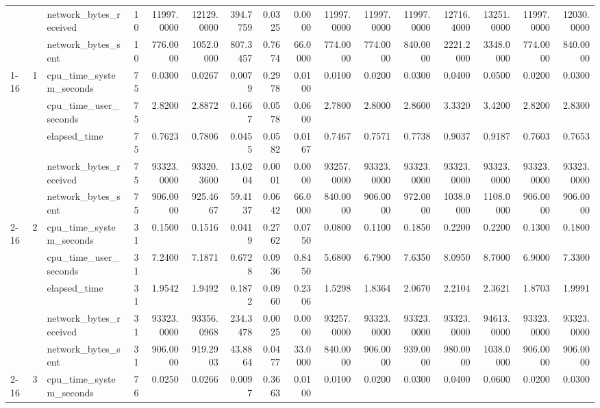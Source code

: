 \begin{tabular}{lllrrrrrrrrrrrrr}
 &  & network\_bytes\_received & 10 & 11997.0000 & 12129.0000 & 394.7759 & 0.0325 & 0.0000 & 11997.0000 & 11997.0000 & 11997.0000 & 12716.4000 & 13251.0000 & 11997.0000 & 12030.0000 \\
 &  & network\_bytes\_sent & 10 & 776.0000 & 1052.0000 & 807.3457 & 0.7674 & 66.0000 & 774.0000 & 774.0000 & 840.0000 & 2221.2000 & 3348.0000 & 774.0000 & 840.0000 \\
\cline{1-16} \cline{2-16}
\multirow[t]{15}{*}{knn-search-duckdb-small} & \multirow[t]{5}{*}{1} & cpu\_time\_system\_seconds & 75 & 0.0300 & 0.0267 & 0.0079 & 0.2978 & 0.0100 & 0.0100 & 0.0200 & 0.0300 & 0.0400 & 0.0500 & 0.0200 & 0.0300 \\
 &  & cpu\_time\_user\_seconds & 75 & 2.8200 & 2.8872 & 0.1667 & 0.0578 & 0.0600 & 2.7800 & 2.8000 & 2.8600 & 3.3320 & 3.4200 & 2.8200 & 2.8300 \\
 &  & elapsed\_time & 75 & 0.7623 & 0.7806 & 0.0455 & 0.0582 & 0.0167 & 0.7467 & 0.7571 & 0.7738 & 0.9037 & 0.9187 & 0.7603 & 0.7653 \\
 &  & network\_bytes\_received & 75 & 93323.0000 & 93320.3600 & 13.0204 & 0.0001 & 0.0000 & 93257.0000 & 93323.0000 & 93323.0000 & 93323.0000 & 93323.0000 & 93323.0000 & 93323.0000 \\
 &  & network\_bytes\_sent & 75 & 906.0000 & 925.4667 & 59.4137 & 0.0642 & 66.0000 & 840.0000 & 906.0000 & 972.0000 & 1038.0000 & 1108.0000 & 906.0000 & 906.0000 \\
\cline{2-16}
 & \multirow[t]{5}{*}{2} & cpu\_time\_system\_seconds & 31 & 0.1500 & 0.1516 & 0.0419 & 0.2762 & 0.0750 & 0.0800 & 0.1100 & 0.1850 & 0.2200 & 0.2200 & 0.1300 & 0.1800 \\
 &  & cpu\_time\_user\_seconds & 31 & 7.2400 & 7.1871 & 0.6728 & 0.0936 & 0.8450 & 5.6800 & 6.7900 & 7.6350 & 8.0950 & 8.7000 & 6.9000 & 7.3300 \\
 &  & elapsed\_time & 31 & 1.9542 & 1.9492 & 0.1872 & 0.0960 & 0.2306 & 1.5298 & 1.8364 & 2.0670 & 2.2104 & 2.3621 & 1.8703 & 1.9991 \\
 &  & network\_bytes\_received & 31 & 93323.0000 & 93356.0968 & 234.3478 & 0.0025 & 0.0000 & 93257.0000 & 93323.0000 & 93323.0000 & 93323.0000 & 94613.0000 & 93323.0000 & 93323.0000 \\
 &  & network\_bytes\_sent & 31 & 906.0000 & 919.2903 & 43.8864 & 0.0477 & 33.0000 & 840.0000 & 906.0000 & 939.0000 & 980.0000 & 1038.0000 & 906.0000 & 906.0000 \\
\cline{2-16}
 & \multirow[t]{5}{*}{3} & cpu\_time\_system\_seconds & 76 & 0.0250 & 0.0266 & 0.0097 & 0.3663 & 0.0100 & 0.0100 & 0.0200 & 0.0300 & 0.0400 & 0.0600 & 0.0200 & 0.0300 \\

\end{tabular}
